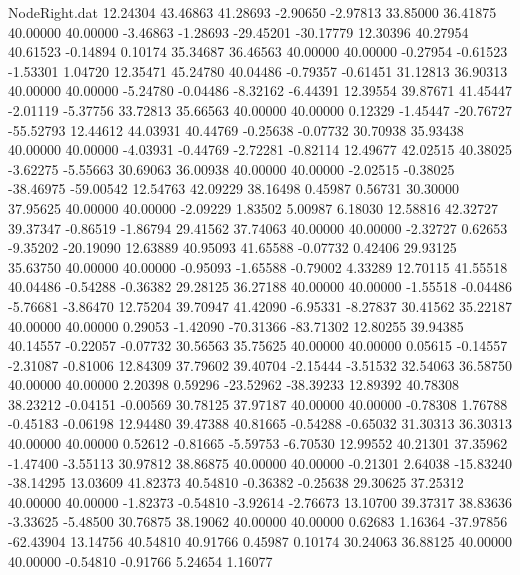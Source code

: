 \begin{filecontents}{NodeRight.dat}
  12.24304   43.46863   41.28693    -2.90650   -2.97813   33.85000   36.41875   40.00000   40.00000   -3.46863   -1.28693  -29.45201  -30.17779
  12.30396   40.27954   40.61523    -0.14894    0.10174   35.34687   36.46563   40.00000   40.00000   -0.27954   -0.61523   -1.53301    1.04720
  12.35471   45.24780   40.04486    -0.79357   -0.61451   31.12813   36.90313   40.00000   40.00000   -5.24780   -0.04486   -8.32162   -6.44391
  12.39554   39.87671   41.45447    -2.01119   -5.37756   33.72813   35.66563   40.00000   40.00000    0.12329   -1.45447  -20.76727  -55.52793
  12.44612   44.03931   40.44769    -0.25638   -0.07732   30.70938   35.93438   40.00000   40.00000   -4.03931   -0.44769   -2.72281   -0.82114
  12.49677   42.02515   40.38025    -3.62275   -5.55663   30.69063   36.00938   40.00000   40.00000   -2.02515   -0.38025  -38.46975  -59.00542
  12.54763   42.09229   38.16498     0.45987    0.56731   30.30000   37.95625   40.00000   40.00000   -2.09229    1.83502    5.00987    6.18030
  12.58816   42.32727   39.37347    -0.86519   -1.86794   29.41562   37.74063   40.00000   40.00000   -2.32727    0.62653   -9.35202  -20.19090
  12.63889   40.95093   41.65588    -0.07732    0.42406   29.93125   35.63750   40.00000   40.00000   -0.95093   -1.65588   -0.79002    4.33289
  12.70115   41.55518   40.04486    -0.54288   -0.36382   29.28125   36.27188   40.00000   40.00000   -1.55518   -0.04486   -5.76681   -3.86470
  12.75204   39.70947   41.42090    -6.95331   -8.27837   30.41562   35.22187   40.00000   40.00000    0.29053   -1.42090  -70.31366  -83.71302
  12.80255   39.94385   40.14557    -0.22057   -0.07732   30.56563   35.75625   40.00000   40.00000    0.05615   -0.14557   -2.31087   -0.81006
  12.84309   37.79602   39.40704    -2.15444   -3.51532   32.54063   36.58750   40.00000   40.00000    2.20398    0.59296  -23.52962  -38.39233
  12.89392   40.78308   38.23212    -0.04151   -0.00569   30.78125   37.97187   40.00000   40.00000   -0.78308    1.76788   -0.45183   -0.06198
  12.94480   39.47388   40.81665    -0.54288   -0.65032   31.30313   36.30313   40.00000   40.00000    0.52612   -0.81665   -5.59753   -6.70530
  12.99552   40.21301   37.35962    -1.47400   -3.55113   30.97812   38.86875   40.00000   40.00000   -0.21301    2.64038  -15.83240  -38.14295
  13.03609   41.82373   40.54810    -0.36382   -0.25638   29.30625   37.25312   40.00000   40.00000   -1.82373   -0.54810   -3.92614   -2.76673
  13.10700   39.37317   38.83636    -3.33625   -5.48500   30.76875   38.19062   40.00000   40.00000    0.62683    1.16364  -37.97856  -62.43904
  13.14756   40.54810   40.91766     0.45987    0.10174   30.24063   36.88125   40.00000   40.00000   -0.54810   -0.91766    5.24654    1.16077

\end{filecontents}
